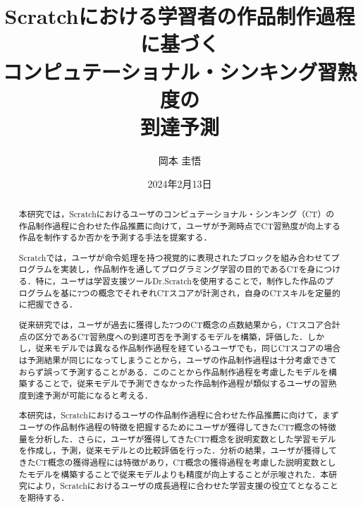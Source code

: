\documentclass[11pt,dvipdfmx]{jreport}
\title{Scratchにおける学習者の作品制作過程に基づく\\
コンピュテーショナル・シンキング習熟度の\\
到達予測}
\author{岡本 圭悟}
\date{2024年2月13日}	%
\begin{document}
\maketitle

\begin{abstract}
本研究では，Scratchにおけるユーザのコンピュテーショナル・シンキング（CT）の作品制作過程に合わせた作品推薦に向けて，ユーザが予測時点でCT習熟度が向上する作品を制作するか否かを予測する手法を提案する．

Scratchでは，ユーザが命令処理を持つ視覚的に表現されたブロックを組み合わせてプログラムを実装し，作品制作を通してプログラミング学習の目的であるCTを身につける．特に，ユーザは学習支援ツールDr.Scratchを使用することで，制作した作品のプログラムを基に7つの概念でそれぞれCTスコアが計測され，自身のCTスキルを定量的に把握できる．

従来研究では，ユーザが過去に獲得した7つのCT概念の点数結果から，CTスコア合計点の区分であるCT習熟度への到達可否を予測するモデルを構築，評価した．しかし，従来モデルでは異なる作品制作過程を経ているユーザでも，同じCTスコアの場合は予測結果が同じになってしまうことから，ユーザの作品制作過程は十分考慮できておらず誤って予測することがある．このことから作品制作過程を考慮したモデルを構築することで，従来モデルで予測できなかった作品制作過程が類似するユーザの習熟度到達予測が可能になると考える．

本研究は，Scratchにおけるユーザの作品制作過程に合わせた作品推薦に向けて，まずユーザの作品制作過程の特徴を把握するためにユーザが獲得してきたCT7概念の特徴量を分析した．さらに，ユーザが獲得してきたCT7概念を説明変数とした学習モデルを作成し，予測，従来モデルとの比較評価を行った．分析の結果，ユーザが獲得してきたCT概念の獲得過程には特徴があり，CT概念の獲得過程を考慮した説明変数としたモデルを構築することで従来モデルよりも精度が向上することが示唆された．本研究により，Scratchにおけるユーザの成長過程に合わせた学習支援の役立てとなることを期待する．

\end{abstract}

\tableofcontents



\newpage
{}	%


\end{document}
